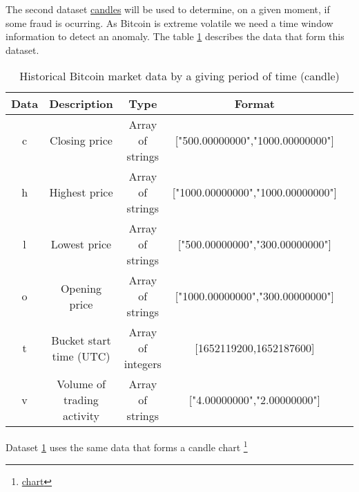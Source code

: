 The second dataset \href{https://api.mercadobitcoin.net/api/v4/docs\#tag/Public-Data/paths/\~1candles/get}{candles} will
be used to determine, on a given moment, if some fraud is ocurring. As Bitcoin is extreme volatile we need a time window
information to detect an anomaly. The table \ref{dataset2} describes the data that form this dataset.

\begin{table}[ht]
    \centering
    \caption{Historical Bitcoin market data by a giving period of time (candle)}
    \label{dataset2}
    \setlength{\tabcolsep}{2pt}
    \small
    \begin{tabular}{|c | c | c | c | c|}
    \hline
    \multicolumn{1}{|p{2cm}}{\centering Data} & \multicolumn{1}{|p{2cm}}{\centering Description} &
    \multicolumn{1}{|p{2cm}}{\centering Type} & \multicolumn{1}{|p{2.8cm}|}{\centering Format} \\ \hline
    \multirow{1}{*}{\centering c} & \centering Closing price & Array of strings & ["500.00000000","1000.00000000"]\\
    \hline
    \multirow{1}{*}{\centering h} & \centering Highest price & Array of strings & ["1000.00000000","1000.00000000"]\\
    \hline
    \multirow{1}{*}{\centering l}& \centering Lowest price & Array of strings & ["500.00000000","300.00000000"]\\ \hline
    \multirow{1}{*}{\centering o}& \centering Opening price & Array of strings & ["1000.00000000","300.00000000"]\\
    \hline
    \multirow{1}{*}{\centering t}& \centering Bucket start time (UTC) & Array of integers & [1652119200,1652187600]\\
    \hline
    \multirow{1}{*}{\centering v}& \centering Volume of trading activity & Array of strings &
    ["4.00000000","2.00000000"]\\ \hline
    \end{tabular}
\end{table}

Dataset \ref{dataset2} uses the same data that forms a candle chart
\footnote{\href{https://br.tradingview.com/symbols/BTCBRL/?exchange=MERCADO}{chart}}
